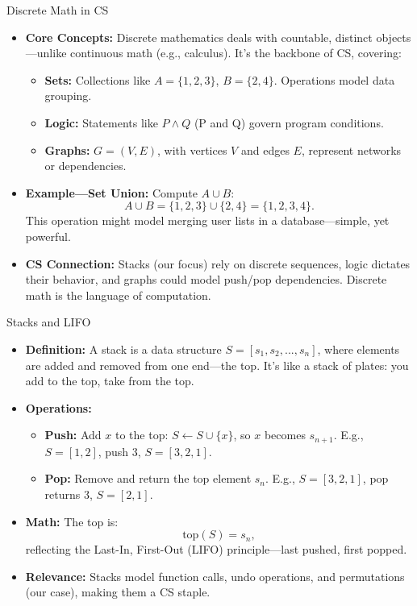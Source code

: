 \begin{frame}{Discrete Math in CS}
    \begin{itemize}
        \item \textbf{Core Concepts:} Discrete mathematics deals with countable, distinct objects—unlike continuous math (e.g., calculus). It’s the backbone of CS, covering:
        \begin{itemize}
            \item \textbf{Sets:} Collections like \( A = \{1, 2, 3\} \), \( B = \{2, 4\} \). Operations model data grouping.
            \item \textbf{Logic:} Statements like \( P \land Q \) (P and Q) govern program conditions.
            \item \textbf{Graphs:} \( G = (V, E) \), with vertices \( V \) and edges \( E \), represent networks or dependencies.
        \end{itemize}
        \item \textbf{Example—Set Union:} Compute \( A \cup B \):
        \[
        A \cup B = \{1, 2, 3\} \cup \{2, 4\} = \{1, 2, 3, 4\}.
        \]
        This operation might model merging user lists in a database—simple, yet powerful.
        \item \textbf{CS Connection:} Stacks (our focus) rely on discrete sequences, logic dictates their behavior, and graphs could model push/pop dependencies. Discrete math is the language of computation.
    \end{itemize}
\end{frame}

\begin{frame}{Stacks and LIFO}
    \begin{itemize}
        \item \textbf{Definition:} A stack is a data structure \( S = [s_1, s_2, ..., s_n] \), where elements are added and removed from one end—the top. It’s like a stack of plates: you add to the top, take from the top.
        \item \textbf{Operations:}
        \begin{itemize}
            \item \textbf{Push:} Add \( x \) to the top: \( S \leftarrow S \cup \{x\} \), so \( x \) becomes \( s_{n+1} \). E.g., \( S = [1, 2] \), push 3, \( S = [3, 2, 1] \).
            \item \textbf{Pop:} Remove and return the top element \( s_n \). E.g., \( S = [3, 2, 1] \), pop returns 3, \( S = [2, 1] \).
        \end{itemize}
        \item \textbf{Math:} The top is:
        \[
        \text{top}(S) = s_n,
        \]
        reflecting the Last-In, First-Out (LIFO) principle—last pushed, first popped.
        \item \textbf{Relevance:} Stacks model function calls, undo operations, and permutations (our case), making them a CS staple.
    \end{itemize}
\end{frame}

